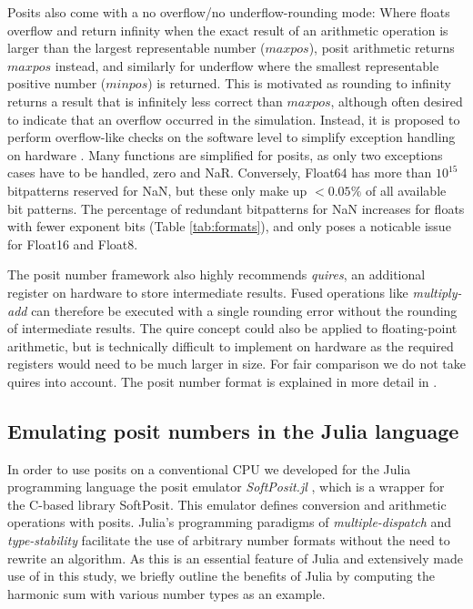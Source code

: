 \documentclass[draft]{agujournal2019}
\begin{document}
Posits also come with a no overflow/no underflow-rounding mode: Where floats overflow and return infinity when the exact result of an arithmetic operation is larger than the largest representable number ($maxpos$), posit arithmetic returns $maxpos$ instead, and similarly for underflow where the smallest representable positive number ($minpos$) is returned. This is motivated as rounding to infinity returns a result that is infinitely less correct than $maxpos$, although often desired to indicate that an overflow occurred in the simulation. Instead, it is proposed to perform overflow-like checks on the software level to simplify exception handling on hardware \cite{Gustafson2017b}. Many functions are simplified for posits, as only two exceptions cases have to be handled, zero and NaR. Conversely, Float64 has more than $10^{15}$ bitpatterns reserved for NaN, but these only make up $< 0.05\%$ of all available bit patterns. The percentage of redundant bitpatterns for NaN increases for floats with fewer exponent bits (Table \ref{tab:formats}), and only poses a noticable issue for Float16 and Float8.

The posit number framework also highly recommends \emph{quires}, an additional register on hardware to store intermediate results. Fused operations like \emph{multiply-add} can therefore be executed with a single rounding error without the rounding of intermediate results. The quire concept could also be applied to floating-point arithmetic, but is technically difficult to implement on hardware as the required registers would need to be much larger in size. For fair comparison we do not take quires into account. The posit number format is explained in more detail in .

\subsection{Emulating posit numbers in the Julia language}
\label{sec:Julia}

In order to use posits on a conventional CPU we developed for the Julia programming language \cite{Bezanson2014} the posit emulator \emph{SoftPosit.jl} \cite{Kloewer2019}, which is a wrapper for the C-based library SoftPosit. This emulator defines conversion and arithmetic operations with posits. Julia's programming paradigms of \emph{multiple-dispatch} and \emph{type-stability} facilitate the use of arbitrary number formats without the need to rewrite an algorithm. As this is an essential feature of Julia and extensively made use of in this study, we briefly outline the benefits of Julia by computing the harmonic sum with various number types as an example.
\end{document}
